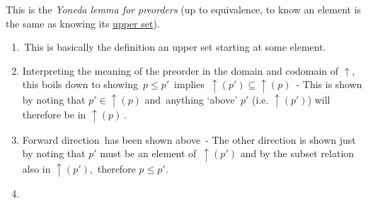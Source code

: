 This is the \emph{Yoneda lemma for preorders} (up to equivalence, to know an element is the same as knowing its \href{doc/1 math/Seven Sketches in Compositionality/1 Chapter 1: Generative Effects/3 Preorders/Upper set}{upper set}).
  \begin{enumerate}
    \item \,This is basically the definition an upper set starting at some element.\,
    \item Interpreting the meaning of the preorder in the domain and codomain of $\uparrow$, this boils down to showing \,$p \leq p'$\, implies \,$\uparrow(p') \subseteq \uparrow(p)$\,
          - This is shown by noting that $p' \in \uparrow(p)$ and \,anything `above' $p'$ (i.e. $\uparrow(p')$) will therefore be in $\uparrow(p)$\,.
    \item Forward direction \,has been shown above\,
          - The other direction is shown just by noting that $p\prime$ must be an element of \,$\uparrow(p\prime)$ and by the subset relation also in $\uparrow(p')$,\, therefore $p \leq p'$.
    \item \,  \,
  \end{enumerate}